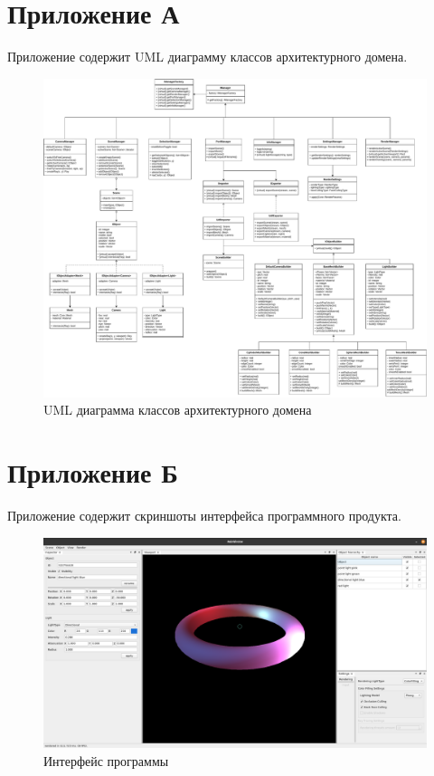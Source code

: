 \chapter*{Приложение А}

Приложение содержит UML диаграмму классов архитектурного домена.

\begin{figure}
	\centering
	\includegraphics[angle=90,width=\linewidth,height=\textheight,keepaspectratio]{diagrams/uml.pdf}
	\caption{UML диаграмма классов архитектурного домена}
	\label{uml:arch}
\end{figure}

\chapter*{Приложение Б}

Приложение содержит скриншоты интерфейса программного продукта.

\begin{figure}
	\centering
	\includegraphics[angle=90,origin=c,width=\linewidth,height=0.7\textheight,keepaspectratio]{inc/img/screenshot-1.png}
	\caption{Интерфейс программы}
	\label{demo:screenshot:1}
\end{figure}


